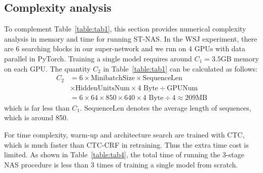\documentclass{article}
\newcommand{\tabref}{Table~\ref}
\begin{document}
\subsection{Complexity analysis}
\label{sec:exp:resource}
\vspace{-1mm}
To complement \tabref{table:tab1}, this section provides numerical complexity analysis in memory and time for running ST-NAS.
In the WSJ experiment, there are 6 searching blocks in our super-network and we run on 4 GPUs with data parallel in PyTorch.
Training a single model requires around $C_1=3.5\text{GB}$ memory on each GPU.
The quantity $C_2$ in \tabref{table:tab1} can be calculated as follows:
\begin{equation}
    \begin{aligned}
        C_2 & = 6 \times \text{MinibatchSize} \times \text{SequenceLen}                          \\
            & \times \text{HiddenUnitsNum}\times 4\text{~Byte} \div \text{GPUNum}                \\
            & =6\times 64 \times 850 \times 640 \times 4\text{~Byte} \div 4 \approx 209\text{MB}
    \end{aligned}
\end{equation}
which is far less than $C_1$. $\text{SequenceLen}$ denotes the average length of sequences, which is around 850.

For time complexity, warm-up and architecture search are trained with CTC, which is much faster than CTC-CRF in retraining. Thus the extra time cost is limited.
As shown in \tabref{table:tab4}, the total time of running the 3-stage NAS procedure is less than 3 times of training a single model from scratch.
\end{document}
